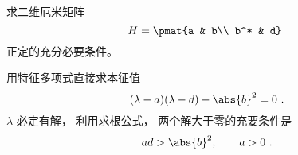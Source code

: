 \begin{example}{}
求二维厄米矩阵
\begin{equation}
H = \pmat{a & b\\ b^* & d}~
\end{equation}
正定的充分必要条件。

用特征多项式直接求本征值
\begin{equation}
(\lambda - a)(\lambda - d) - \abs{b}^2 = 0~.
\end{equation}
$\lambda$ 必定有解， 利用求根公式， 两个解大于零的充要条件是
\begin{equation}
ad > \abs{b}^2, \qquad
a > 0~.
\end{equation}
\end{example}
